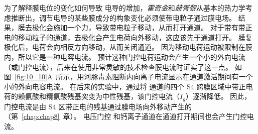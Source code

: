 为了解释膜电位的变化如何导致  电导的增加，\textit{霍奇金}和\textit{赫胥黎}从基本的热力学考虑推断出，调节电导的某些膜成分的构象变化必须使带电粒子通过膜电场。
结果，膜去极化会施加一个力，导致带电粒子移动，从而打开通道。
对于带有带正电的移动粒子的通道，去极化会产生电荷向外移动，这应该先于通道打开。
膜复极化后，电荷会向相反方向移动，从而关闭通道。 
因为移动电荷运动被限制在膜内，所以它是一种电容电流。
预计这种门控电荷运动会产生一个小的外向电流（或门控电流），后来在使用非常灵敏的技术检查膜电流时证实了这一点。
如图~\ref{fig:10_10}A~所示，用河豚毒素阻断内向离子电流显示在通道激活期间有一个小的外向电容电流。 
在后来的实验中，通过将  通道的四个 S4 跨膜区域中带正电荷的赖氨酸和精氨酸残基突变为中性残基，该门控电流（$I_g$）逐渐降低。 
因此，门控电流是由 S4 区带正电的残基通过膜电场向外移动产生的（第~\ref{chap:chap8}~章）。 
电压门控  和钙离子通道在通道打开期间也会产生门控电流。


